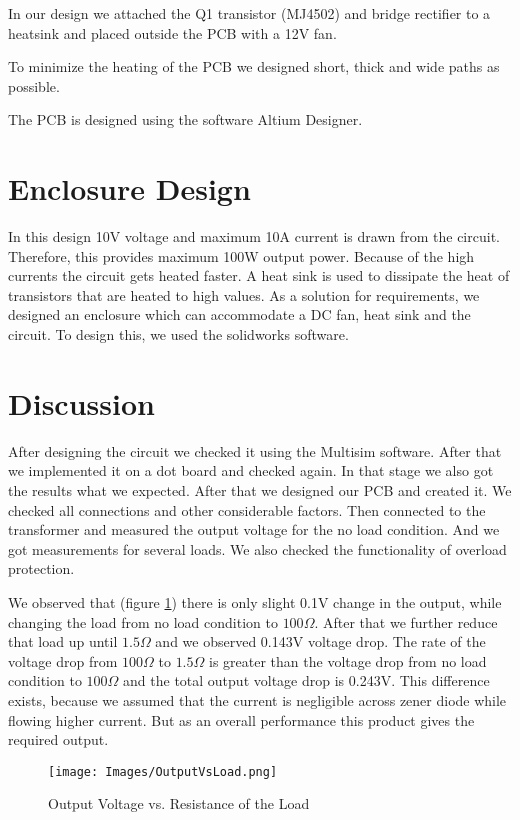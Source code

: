 \documentclass[11pt,a4paper]{article}
\begin{document}
\begin{multicols}{2}
In our design we attached the Q1 transistor (MJ4502) and bridge rectifier to a heatsink and placed outside the PCB with a 12V fan.

To minimize the heating of the PCB we designed short, thick and wide paths as possible.

The PCB is designed using the software Altium Designer.

\section{Enclosure Design }
In this design 10V voltage and maximum 10A current is drawn from the circuit. Therefore, this provides maximum 100W output power. Because of the high currents the circuit gets heated faster. A heat sink is used to dissipate the heat of transistors that are heated to high values. As a solution for requirements, we designed an enclosure which can accommodate a DC fan, heat sink and the circuit. To design this, we used the solidworks software.


\section{Discussion}
After designing the circuit we checked it using the Multisim software. After that we implemented it on a dot board and checked again. In that stage we also got the results what we expected. After that we designed our PCB and created it. We checked all connections and other considerable factors. Then connected to the transformer and measured the output voltage for the no load condition. And we got measurements for several loads. We also checked the functionality of overload protection. 

We observed that (figure \ref{fig:OutputVsResistanceLoad}) there is only slight 0.1V change in the output, while changing the load from no load condition to $100\Omega$. After that we  further reduce that load up until $1.5\Omega$  and we observed 0.143V voltage drop. The rate of the voltage drop from $100\Omega$ to $1.5\Omega$ is greater than the voltage drop from no load condition to $100\Omega$ and the total output voltage drop is 0.243V. This  difference exists, because we assumed that the current is negligible across zener diode while flowing higher current. But as an overall performance this product gives the required output. 

\begin{figure}[H]
    \centering
    \texttt{[image: Images/OutputVsLoad.png]}
    \caption{Output Voltage vs. Resistance of the Load}
    \label{fig:OutputVsResistanceLoad}
\end{figure}



\end{multicols}
\end{document}
